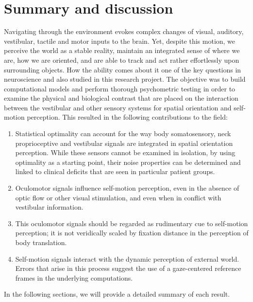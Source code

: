\chapter{Summary and discussion}

Navigating through the environment evokes complex changes of visual, auditory, vestibular, tactile and
motor inputs to the brain. Yet, despite this motion, we perceive the world as a stable reality, maintain an integrated sense of where we are, how we are oriented, and are able to track and act rather effortlessly upon surrounding objects.  How the ability comes about it one of the key questions in neuroscience and also studied in this research project. The objective was to build computational models and perform thorough psychometric testing in order to examine the physical and biological contrast that are placed on the interaction between the vestibular and other sensory systems for spatial orientation and self-motion perception. This resulted in the following contributions to the field:

\begin{enumerate}
\item Statistical optimality can account for the way body somatosensory, neck proprioceptive and vestibular signals are integrated in spatial orientation perception. While these sensors cannot be examined in isolation, by using optimality as a starting point, their noise properties can be determined and linked to clinical deficits that are seen in particular patient groups.
\item Oculomotor signals influence self-motion perception, even in the absence of optic flow or other visual stimulation, and even when in conflict with vestibular information. 
\item This oculomotor signals should be regarded as rudimentary cue to self-motion perception; it is not veridically scaled by fixation distance in the perception of body translation. 
\item Self-motion signals interact with the dynamic perception of external world.  Errors that arise in this process suggest the use of a gaze-centered reference frames in the underlying computations. 
\end{enumerate}

In the following sections, we will provide a detailed summary of each result. 

